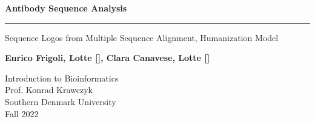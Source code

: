 \begin{titlepage}
    \begin{center}
        \vspace*{1cm}
        
        \Huge
        \textbf{Antibody Sequence Analysis}

        \vspace{0.3cm}

        \rule{\textwidth}{.4pt}

        \vspace{0.5cm}
        
        \LARGE
        Sequence Logos from Multiple Sequence Alignment, Humanization Model 
        
        
        \vfill

        \Large
        
        \textbf{Enrico Frigoli, Lotte [], Clara Canavese, Lotte []}
        
        \vspace{1cm}
        
        
        \vspace{0.8cm}
        
        
        \Large
        Introduction to Bioinformatics  \\
        Prof. Konrad Krawczyk \\
        Southern Denmark University \\
        Fall 2022

        
    \end{center}

\end{titlepage}